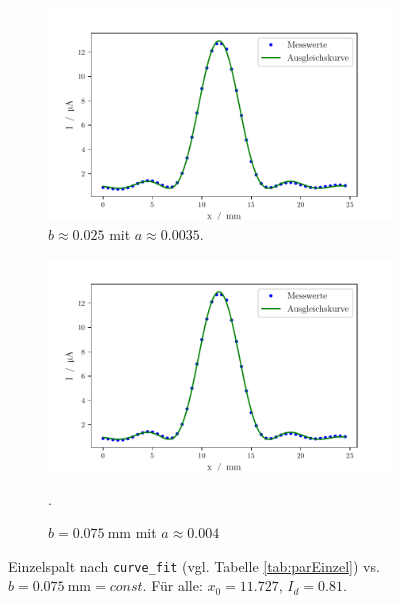 \begin{figure}
    \centering
    \begin{subfigure}{.7\textwidth}
        \centering
        \includegraphics[width=.7\textwidth]{python/EinzelspaltFit.pdf}
        \caption{$b \approx 0.025$ mit $a \approx 0.0035$.}
        \label{fig:lsd3ss}
    \end{subfigure}%
    \begin{subfigure}{.7\textwidth}
        \centering
        \includegraphics[width=.7\linewidth]{python/EinzelspaltFits.pdf}
        \caption{$b = \SI{0.075}{\milli\meter}$ mit $a \approx 0.004$}.
        \label{fig:lsd3s}
    \end{subfigure}
    \caption{Einzelspalt nach \texttt{curve\_fit} (vgl. Tabelle \ref{tab:parEinzel}) vs. $b = \SI{0.075}{\milli\meter} = const$. Für alle: $x_0 = 11.727$, $I_d = 0.81$.}
    \label{fig:ggn2}
\end{figure}